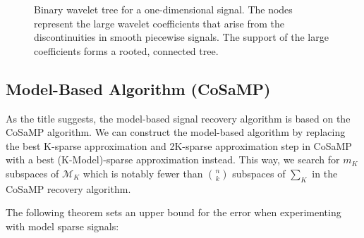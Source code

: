 \documentclass[titlepage,oneside, 12pt]{book}
\theoremstyle{break}
\begin{document}
\begin{figure}[H]



\begin{center}


\end{center}
\caption{Binary wavelet tree for a one-dimensional signal. The nodes represent the large wavelet coefficients that arise from the discontinuities in smooth piecewise signals. The support of the large coefficients forms a rooted, connected tree.
}
\label{fig:ModelTree}
\end{figure}

\newpage

\subsection{Model-Based Algorithm (CoSaMP)} 

As the title suggests, the model-based signal recovery algorithm is based on the CoSaMP algorithm. We can construct the model-based algorithm by replacing the best K-sparse approximation and 2K-sparse approximation step in CoSaMP with a best (K-Model)-sparse approximation instead.  This way, we search for $m_{K}$ subspaces of $\mathcal{M}_{K}$ which is notably fewer than $\binom nk $ subspaces of $\sum_{K}$ in the CoSaMP recovery algorithm. 

The following theorem sets an upper bound for the error when experimenting with model sparse signals:
\end{document}
